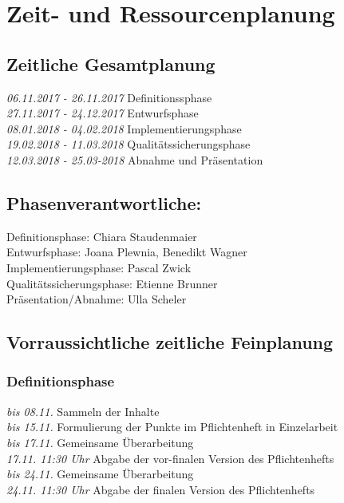 \documentclass[parskip=full]{scrartcl}
\begin{document}
        
\section{Zeit- und Ressourcenplanung}
\subsection{Zeitliche Gesamtplanung}
\textit{06.11.2017 - 26.11.2017} Definitionssphase \\
\textit{27.11.2017 - 24.12.2017} Entwurfsphase \\
\textit{08.01.2018 - 04.02.2018} Implementierungsphase\\
\textit{19.02.2018 - 11.03.2018} Qualitätssicherungsphase\\
\textit{12.03.2018 - 25.03-2018} Abnahme und Präsentation

\subsection{Phasenverantwortliche:}
Definitionsphase: Chiara Staudenmaier\\
Entwurfsphase: Joana Plewnia, Benedikt Wagner\\
Implementierungsphase: Pascal Zwick\\
Qualitätssicherungsphase: Etienne Brunner\\
Präsentation/Abnahme: Ulla Scheler\\
\subsection{Vorraussichtliche zeitliche Feinplanung}
\subsubsection{Definitionsphase}
\textit{bis 08.11.} Sammeln der Inhalte\\
\textit{bis 15.11.} Formulierung der Punkte im Pflichtenheft in Einzelarbeit\\
\textit{bis 17.11.} Gemeinsame Überarbeitung\\
\textit{17.11. 11:30 Uhr} Abgabe der vor-finalen Version des Pflichtenhefts\\
\textit{bis 24.11.} Gemeinsame Überarbeitung\\
\textit{24.11. 11:30 Uhr} Abgabe der finalen Version des Pflichtenhefts \\
\end{document}
